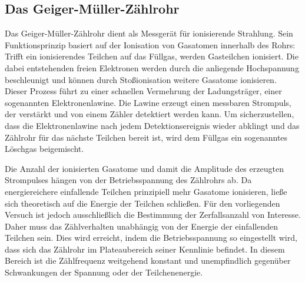 \subsection{Das Geiger-Müller-Zählrohr}
Das Geiger-Müller-Zählrohr dient als Messgerät für ionisierende Strahlung. Sein Funktionsprinzip basiert auf der Ionisation von Gasatomen innerhalb des Rohrs: Trifft ein ionisierendes Teilchen auf das Füllgas, werden Gasteilchen ionisiert. Die dabei entstehenden freien Elektronen werden durch die anliegende Hochspannung beschleunigt und können durch Stoßionisation weitere Gasatome ionisieren. Dieser Prozess führt zu einer schnellen Vermehrung der Ladungsträger, einer sogenannten Elektronenlawine. Die Lawine erzeugt einen messbaren Strompuls, der verstärkt und von einem Zähler detektiert werden kann. Um sicherzustellen, dass die Elektronenlawine nach jedem Detektionsereignis wieder abklingt und das Zählrohr für das nächste Teilchen bereit ist, wird dem Füllgas ein sogenanntes Löschgas beigemischt.

Die Anzahl der ionisierten Gasatome und damit die Amplitude des erzeugten Strompulses hängen von der Betriebsspannung des Zählrohrs ab. Da energiereichere einfallende Teilchen prinzipiell mehr Gasatome ionisieren, ließe sich theoretisch auf die Energie der Teilchen schließen. Für den vorliegenden Versuch ist jedoch ausschließlich die Bestimmung der Zerfallsanzahl von Interesse. Daher muss das Zählverhalten unabhängig von der Energie der einfallenden Teilchen sein. Dies wird erreicht, indem die Betriebsspannung so eingestellt wird, dass sich das Zählrohr im Plateaubereich seiner Kennlinie befindet. In diesem Bereich ist die Zählfrequenz weitgehend konstant und unempfindlich gegenüber Schwankungen der Spannung oder der Teilchenenergie.

